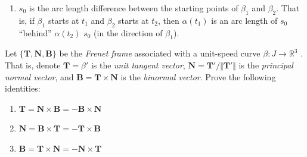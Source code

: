 \documentclass[12 pt, letterpaper]{hmcpset}
\begin{document}
\begin{solution}
\begin{enumerate}
			Now we know that when we have $\beta_{1}$ and $\beta_{2}$ as unit speed reparameterisations, they are defined by arc length parameterisations $\tau_{1}$ and $\tau_{2}$ with inverses $h_{1}$ and $h_{2}$. Since $\tau_{1}$ and $\tau_{2}$ are antiderivatives of the same function --- $\Vert \alpha' \Vert$, we have that $\tau_{2} = \tau_{1} - s_{0}$ for some $s_{0} \in \mathbb{R}$. \\\\
			From this, we can get $h_{2}(s) = h_{1}(s + s_{0})$. Notice that for any $s \in J$ we have $s = \tau_{2}(t) = \tau_{1}(t) - s_{0}$. We can rewrite this as $\tau_{2}(t) = s$ and $\tau_{1}(t) = s + s_{0}$. Thus, taking $h_{1}$ and $h_{2}$ of both sides in the first and second equations respectively, we get
			\[
				h_{1}(s + s_{0}) = t = h_{2}(s)
			\]
			for any $s \in J$.
		\item $s_{0}$ is the arc length difference between the starting points of $\beta_{1}$ and $\beta_{2}$. That is, if $\beta_{1}$ starts at $t_{1}$ and $\beta_{2}$ starts at $t_{2}$, then $\alpha(t_{1})$ is an arc length of $s_{0}$ ``behind'' $\alpha(t_{2})$ $s_{0}$ (in the direction of $\beta_{1}$).
	\end{enumerate}
\end{solution}

\pagebreak

\begin{problem}[Problem 5.]
	Let $\{ \mathbf{T}, \mathbf{N}, \mathbf{B} \}$  be the \textit{Frenet frame} associated with a unit-speed curve $\beta : J \to \mathbb{R}^{3}$ . That is, denote $\mathbf{T} = \beta'$  is the \textit{unit tangent vector}, $\mathbf{N} = \mathbf{T}'/\Vert \mathbf{T}' \Vert$  is the \textit{principal normal vector}, and $\mathbf{B} = \mathbf{T} \times \mathbf{N}$ is the \textit{binormal vector}. Prove the following identities:
	\begin{enumerate}
		\item $\mathbf{T} = \mathbf{N} \times \mathbf{B} = - \mathbf{B} \times \mathbf{N}$
		\item $\mathbf{N} = \mathbf{B} \times \mathbf{T} = - \mathbf{T} \times \mathbf{B}$
		\item $\mathbf{B} = \mathbf{T} \times \mathbf{N} = - \mathbf{N} \times \mathbf{T}$
	\end{enumerate}
\end{problem}
\end{document}
